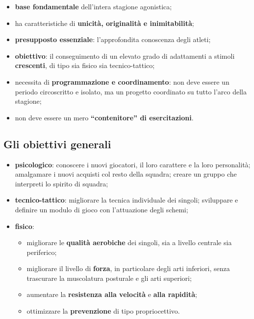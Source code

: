 \begin{itemize}
  \item \textbf{base fondamentale} dell'intera stagione agonistica;
  \item ha caratteristiche di \textbf{unicità, originalità e inimitabilità};
  \item \textbf{presupposto essenziale}: l'approfondita conoscenza degli atleti;
  \item \textbf{obiettivo}: il conseguimento di un elevato grado di adattamenti a stimoli
    \textbf{crescenti}, di tipo sia fisico sia tecnico-tattico;
  \item necessita di \textbf{programmazione e coordinamento}: non deve essere un periodo
    circoscritto e isolato, ma un progetto coordinato su tutto l'arco della stagione;
  \item non deve essere un mero \textbf{``contenitore'' di esercitazioni}.
\end{itemize}

\subsection{Gli obiettivi generali}

\begin{itemize}
  \item \textbf{psicologico}: conoscere i nuovi giocatori, il loro carattere e la loro personalità;
    amalgamare i nuovi acquisti col resto della squadra; creare un gruppo che interpreti lo spirito
    di squadra;
  \item \textbf{tecnico-tattico}: migliorare la tecnica individuale dei singoli; sviluppare e
    definire un modulo di gioco con l'attuazione degli schemi;
  \item \textbf{fisico}:
    \begin{itemize}
      \item migliorare le \textbf{qualità aerobiche} dei singoli, sia a livello centrale sia
        periferico;
      \item migliorare il livello di \textbf{forza}, in particolare degli arti inferiori, senza
        trascurare la muscolatura posturale e gli arti superiori;
      \item aumentare la \textbf{resistenza alla velocità} e \textbf{alla rapidità};
      \item ottimizzare la \textbf{prevenzione} di tipo propriocettivo.
    \end{itemize}
\end{itemize}


